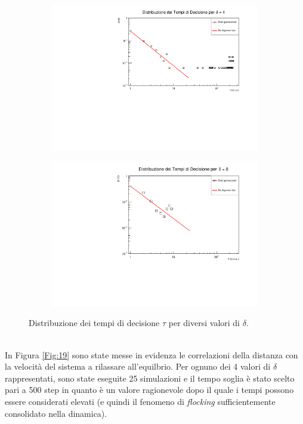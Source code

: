 \documentclass[letterpaper,10pt]{article}
\begin{document}
\begin{figure}[h]
\ContinuedFloat
\centering
\begin{subfigure}[t]{0.925\textwidth}
\includegraphics[width=\linewidth]{Gravitazione/tau4.pdf}
\end{subfigure}
\begin{subfigure}[t]{0.925\textwidth}
\includegraphics[width=\linewidth]{Gravitazione/tau8.pdf}
\end{subfigure}
\label{Fig:18}
\caption{Distribuzione dei tempi di decisione $\tau$ per diversi valori di $\delta$.}
\end{figure}\\
In Figura \ref{Fig:19} sono state messe in evidenza le correlazioni della distanza con la velocità del sistema a rilassare all'equilbrio. Per ognuno dei 4 valori di $\delta$ rappresentati, sono state eseguite 25 simulazioni e il tempo soglia è stato scelto pari a 500 step in quanto è un valore ragionevole dopo il quale i tempi possono essere considerati elevati (e quindi il fenomeno di \textit{flocking} sufficientemente consolidato nella dinamica).
\end{document}
